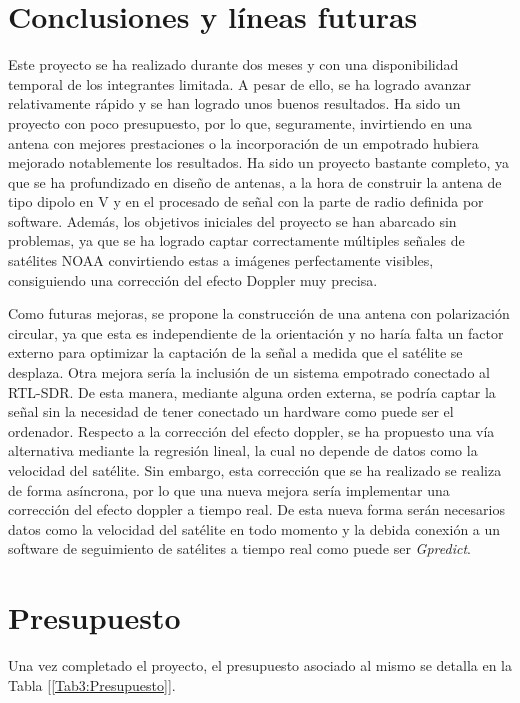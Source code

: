 \documentclass[a4paper,openright,12pt]{article}
\begin{document}
\newpage
\section{Conclusiones y líneas futuras}

Este proyecto se ha realizado durante dos meses y con una disponibilidad temporal de los integrantes limitada. A pesar de ello, se ha logrado avanzar relativamente rápido y se han logrado unos buenos resultados. Ha sido un proyecto con poco presupuesto, por lo que, seguramente, invirtiendo en una antena con mejores prestaciones o la incorporación de un empotrado hubiera mejorado notablemente los resultados.
Ha sido un proyecto bastante completo, ya que se ha profundizado en diseño de antenas, a la hora de construir la antena de tipo dipolo en V y en el procesado de señal con la parte de radio definida por software. Además, los objetivos iniciales del proyecto se han abarcado sin problemas, ya que se ha logrado captar correctamente múltiples señales de satélites NOAA convirtiendo estas a imágenes perfectamente visibles, consiguiendo una corrección del efecto Doppler muy precisa.

Como futuras mejoras, se propone la construcción de una antena con polarización circular, ya que esta es independiente de la orientación y no haría falta un factor externo para optimizar la captación de la señal a medida que el satélite se desplaza. 
Otra mejora sería la inclusión de un sistema empotrado conectado al RTL-SDR. De esta manera, mediante alguna orden externa, se podría captar la señal sin la necesidad de tener conectado un hardware como puede ser el ordenador.
Respecto a la corrección del efecto doppler, se ha propuesto una vía alternativa mediante la regresión lineal, la cual no depende de datos como la velocidad del satélite. Sin embargo, esta corrección que se ha realizado se realiza de forma asíncrona, por lo que una nueva mejora sería implementar una corrección del efecto doppler a tiempo real. De esta nueva forma serán necesarios datos como la velocidad del satélite en todo momento y la debida conexión a un software de seguimiento de satélites a tiempo real como puede ser \textit{Gpredict}.

\section{Presupuesto}
Una vez completado el proyecto, el presupuesto asociado al mismo se detalla en la Tabla [\ref{Tab3:Presupuesto}].
\end{document}
